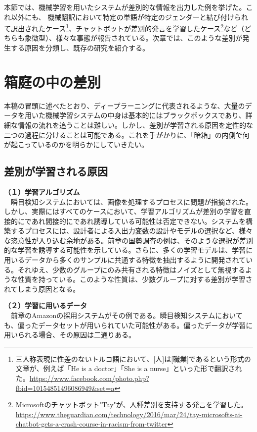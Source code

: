 \documentclass[b5j,twoside,twocolumn]{utarticle}
\begin{document}
本節では、機械学習を用いたシステムが差別的な情報を出力した例を挙げた。これ以外にも、
機械翻訳において特定の単語が特定のジェンダーと結び付けられて訳出されたケース\footnote{三人称表現に性差のないトルコ語において、[人]は[職業]であるという形式の文章が、例えば「He is a doctor」「She is a nurse」といった形で翻訳された。\url{https://www.facebook.com/photo.php?fbid=10154851496086949&set=a}}、チャットボットが差別的発言を学習したケース\footnote{Microsoftのチャットボット"Tay"が、人種差別を支持する発言を学習した。\\\url{https://www.theguardian.com/technology/2016/mar/24/tay-microsofts-ai-chatbot-gets-a-crash-course-in-racism-from-twitter}}など（どちらも象徴型）、様々な事態が報告されている。次章では、このような差別が発生する原因を分類し、既存の研究を紹介する。
\section{箱庭の中の差別}
本稿の冒頭に述べたとおり、ディープラーニングに代表されるような、大量のデータを用いた機械学習システムの中身は基本的にはブラックボックスであり、詳細な情報の流れを追うことは難しい。しかし、差別が学習される原因を定性的な二つの過程に分けることは可能である。これを手がかりに、「暗箱」の\.内\.側で何が起こっているのかを明らかにしていきたい。
\subsection{差別が学習される原因}
\textbf{（１）学習アルゴリズム}\\
~~瞬目検知システムにおいては、画像を処理するプロセスに問題が指摘された。
しかし、実際にはすべてのケースにおいて、学習アルゴリズムが差別の学習を直接的にであれ間接的にであれ誘導している可能性は否定できない。システムを構築するプロセスには、設計者による入出力変数の設計やモデルの選択など、様々な恣意性が入り込む余地がある。前章の国勢調査の例は、そのような選択が差別的な学習を誘導する可能性を示している。さらに、多くの学習モデルは、学習に用いるデータから多くのサンプルに共通する特徴を抽出するように開発されている。それゆえ、少数のグループにのみ共有される特徴はノイズとして無視するような性質を持っている。このような性質は、少数グループに対する差別が学習されてしまう原因となる。


\textbf{（２）学習に用いるデータ}\\
~~前章のAmazonの採用システムがその例である。瞬目検知システムにおいても、偏ったデータセットが用いられていた可能性がある。偏ったデータが学習に用いられる場合、その原因は二通りある。
\end{document}
